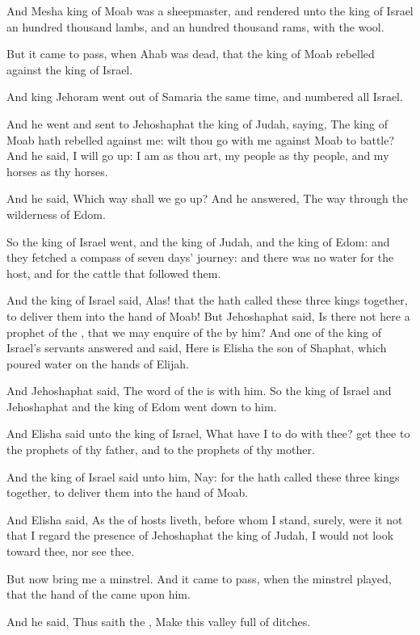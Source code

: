 \verse And Mesha king of Moab was a sheepmaster, and rendered unto the king of Israel an hundred thousand lambs, and an hundred thousand rams, with the wool.

\verse But it came to pass, when Ahab was dead, that the king of Moab rebelled against the king of Israel.

\verse And king Jehoram went out of Samaria the same time, and numbered all Israel.

\verse And he went and sent to Jehoshaphat the king of Judah, saying, The king of Moab hath rebelled against me: wilt thou go with me against Moab to battle? And he said, I will go up: I am as thou art, my people as thy people, and my horses as thy horses.

\verse And he said, Which way shall we go up? And he answered, The way through the wilderness of Edom.

\verse So the king of Israel went, and the king of Judah, and the king of Edom: and they fetched a compass of seven days' journey: and there was no water for the host, and for the cattle that followed them.

\verse And the king of Israel said, Alas! that the \LORD hath called these three kings together, to deliver them into the hand of Moab!  \verse But Jehoshaphat said, Is there not here a prophet of the \LORD, that we may enquire of the \LORD by him? And one of the king of Israel's servants answered and said, Here is Elisha the son of Shaphat, which poured water on the hands of Elijah.

\verse And Jehoshaphat said, The word of the \LORD is with him. So the king of Israel and Jehoshaphat and the king of Edom went down to him.

\verse And Elisha said unto the king of Israel, What have I to do with thee?  get thee to the prophets of thy father, and to the prophets of thy mother.

And the king of Israel said unto him, Nay: for the \LORD hath called these three kings together, to deliver them into the hand of Moab.

\verse And Elisha said, As the \LORD of hosts liveth, before whom I stand, surely, were it not that I regard the presence of Jehoshaphat the king of Judah, I would not look toward thee, nor see thee.

\verse But now bring me a minstrel. And it came to pass, when the minstrel played, that the hand of the \LORD came upon him.

\verse And he said, Thus saith the \LORD, Make this valley full of ditches.

